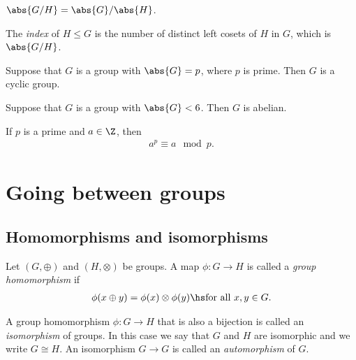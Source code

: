 \documentclass{article}
\begin{document}
\begin{corollary}
	$\abs{G / H}= \abs{G}/\abs{H}$.
\end{corollary}

\begin{definition}
	The \emph{index} of $H\leq G$ is the number of distinct
	left cosets of $H$ in $G$, which is $\abs{G/H}$.
\end{definition}

\begin{theorem}
	Suppose that $G$ is a group with $\abs{G}=p$, where $p$ is
	prime. Then $G$ is a cyclic group.
\end{theorem}

\begin{corollary}
	Suppose that $G$ is a group with $\abs{G}<6$. Then $G$ is abelian.
\end{corollary}

\begin{theorem}
	If $p$ is a prime and $a\in\Z$, then
	\begin{align*}
		a^{p}\equiv a \mod p.
	\end{align*}
\end{theorem}


\section{Going between groups}


\subsection{Homomorphisms and isomorphisms}

\begin{definition}
	Let $(G, \oplus)$ and $(H, \otimes)$ be groups. A map $\phi:G\to H$
	is called a \emph{group homomorphism} if
	\begin{align*}
		\phi(x \oplus y) = \phi(x)\otimes \phi(y)\hs\text{for all }x,y\in G.
	\end{align*}
\end{definition}

\begin{definition}
	A group homomorphism $\phi:G\to H$ that is also a bijection is
	called an \emph{isomorphism} of groups. In this case we say that
	$G$ and $H$ are isomorphic and we write $G\cong H$. An
	isomorphism $G\to G$ is called an \emph{automorphism} of $G$.
\end{definition}
\end{document}
